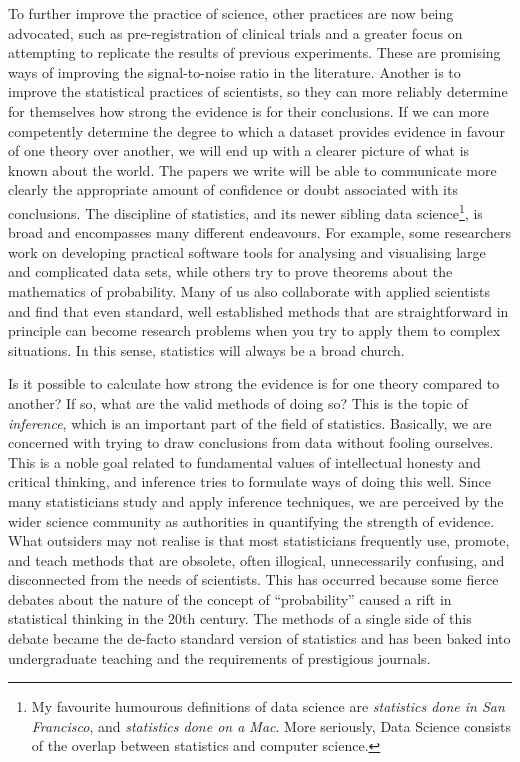 \documentclass[a4paper, 12pt]{article}
\begin{document}
To further improve the practice of science, other practices are now being
advocated, such as pre-registration of clinical trials and
a greater focus on attempting to replicate the results of previous
experiments. These are promising ways of improving the signal-to-noise
ratio in the literature. Another is to improve the statistical
practices of scientists, so they can more reliably determine for themselves
how strong the
evidence is for their conclusions. If we can more competently determine
the degree to which a dataset provides evidence in favour of one theory over
another, we will end up with a clearer picture of what is known about the
world. The papers we write will be able to communicate more clearly the
appropriate amount of confidence or doubt associated with its conclusions.
The discipline of
statistics, and its newer sibling data science\footnote{My favourite
humourous definitions of data science are
{\em statistics done in San Francisco}, and {\em statistics done on a Mac}.
More seriously, Data Science consists of the overlap between statistics and
computer science.},
is broad and encompasses many different endeavours. For example, some researchers
work on developing practical software tools for analysing and visualising large and
complicated data sets, while others try to prove theorems about the mathematics
of probability. Many of us also collaborate with applied scientists and find
that even standard, well established methods that are straightforward in
principle can become research problems when you try to apply them to complex
situations. In this sense, statistics will always be a broad church.

Is it possible to calculate how strong the evidence is for one theory compared
to another? If so, what are the valid methods of doing so? This is the topic
of {\em inference}, which is an important part of the field of statistics.
Basically, we are concerned with trying to
draw conclusions from data without fooling ourselves. This is a noble goal
related to fundamental values of intellectual honesty and critical
thinking, and inference tries to formulate ways of doing this well.
Since many statisticians study and apply inference techniques,
we are perceived by the wider science community as authorities
in quantifying the strength of evidence. What outsiders may not realise is
that most statisticians frequently use, promote, and teach methods that are
obsolete, often illogical, unnecessarily confusing, and disconnected from the
needs of scientists. This has occurred because some fierce debates about the
nature of the concept of ``probability'' caused a rift in statistical thinking
in the 20th century. The methods of a single side of this debate became the
de-facto standard version of statistics and has been baked into undergraduate
teaching and the requirements of prestigious journals.
\end{document}
